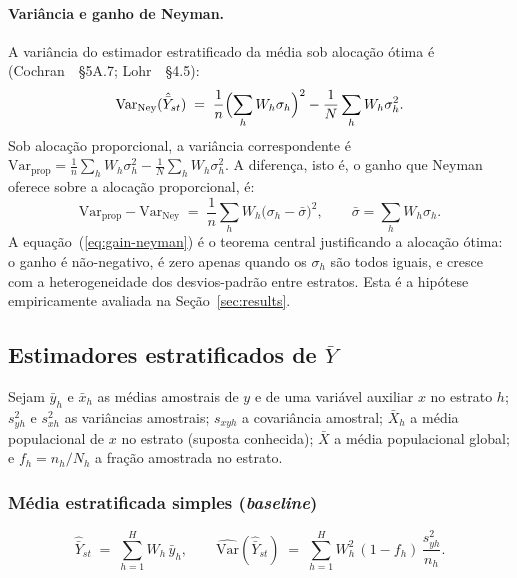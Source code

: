\paragraph{Variância e ganho de Neyman.} A variância do estimador
estratificado da média sob alocação ótima é
(Cochran~\cite{cochran1977}~§5A.7; Lohr~\cite{lohr1999}~§4.5):
\begin{equation}
  \mathrm{Var}_{\mathrm{Ney}}(\hat{\bar{Y}}_{st})
  \;=\; \frac{1}{n}\Bigl(\sum_{h} W_h \sigma_h\Bigr)^{2}
        - \frac{1}{N}\sum_{h} W_h \sigma_h^{2}.
  \label{eq:var-neyman}
\end{equation}
Sob alocação proporcional, a variância correspondente é
$\mathrm{Var}_{\mathrm{prop}} = \frac{1}{n}\sum_h W_h \sigma_h^{2}
- \frac{1}{N}\sum_h W_h \sigma_h^{2}$. A diferença, isto é, o ganho que
Neyman oferece sobre a alocação proporcional, é:
\begin{equation}
  \mathrm{Var}_{\mathrm{prop}} - \mathrm{Var}_{\mathrm{Ney}}
  \;=\; \frac{1}{n}\sum_{h} W_h \bigl(\sigma_h - \bar{\sigma}\bigr)^{2},
  \qquad \bar{\sigma} = \sum_h W_h \sigma_h.
  \label{eq:gain-neyman}
\end{equation}
A equação~(\ref{eq:gain-neyman}) é o teorema central justificando a alocação
ótima: o ganho é não-negativo, é zero apenas quando os $\sigma_h$ são todos
iguais, e cresce com a heterogeneidade dos desvios-padrão entre estratos. Esta
é a hipótese empiricamente avaliada na Seção~\ref{sec:results}.

\subsection{Estimadores estratificados de $\bar{Y}$}
\label{sec:theory:estimators}

Sejam $\bar{y}_h$ e $\bar{x}_h$ as médias amostrais de $y$ e de uma variável
auxiliar $x$ no estrato $h$; $s_{yh}^2$ e $s_{xh}^2$ as variâncias amostrais;
$s_{xyh}$ a covariância amostral; $\bar{X}_h$ a média populacional de $x$ no
estrato (suposta conhecida); $\bar{X}$ a média populacional global; e
$f_h = n_h / N_h$ a fração amostrada no estrato.

\subsubsection{Média estratificada simples (\textit{baseline})}

\begin{equation}
  \hat{\bar{Y}}_{st} \;=\; \sum_{h=1}^{H} W_h\,\bar{y}_h,
  \qquad
  \widehat{\mathrm{Var}}(\hat{\bar{Y}}_{st}) \;=\;
   \sum_{h=1}^{H} W_h^{2}\,(1 - f_h)\,\frac{s_{yh}^2}{n_h}.
  \label{eq:strat-mean}
\end{equation}

